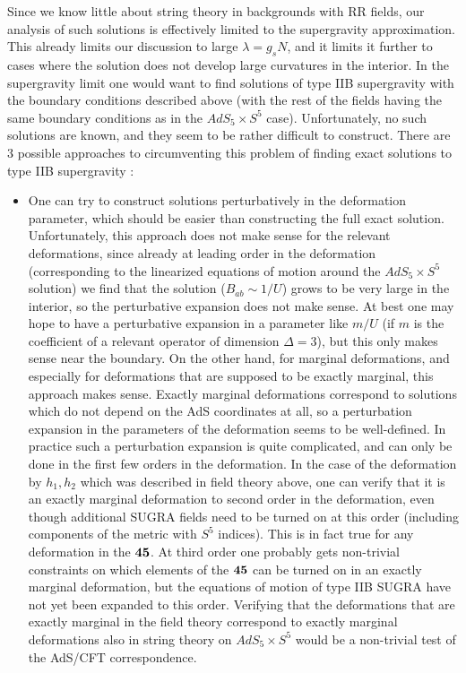  Since we know little about string theory in backgrounds
 with RR fields, our analysis of such solutions is effectively limited
 to the supergravity approximation. This already limits our discussion
 to large $\lambda=g_s N$, and it limits it further to cases where the
 solution does not develop large curvatures in the interior. In the
 supergravity limit one would want to find solutions of type IIB
 supergravity with the boundary conditions described above (with the
 rest of the fields having the same boundary conditions as in the
 $AdS_5\times S^5$ case). Unfortunately, no such solutions are
 known, and they seem to be rather difficult to construct. There are 3
 possible approaches to circumventing this problem of finding exact
 solutions to type IIB supergravity :
\begin{itemize} 
\item{} One can try to construct solutions perturbatively in the
deformation parameter, which should be easier than constructing the
full exact solution. Unfortunately, this approach does not make sense
for the relevant deformations, since already at leading order in the
deformation (corresponding to the linearized equations of motion
around the $AdS_5\times S^5$ solution) we find that the solution
($B_{ab} \sim 1/U$) grows to be very large in the interior, so the
perturbative expansion does not make sense. At best one may hope to
have a perturbative expansion in a parameter like $m/U$ (if $m$ is the
coefficient of a relevant operator of dimension $\Delta=3$),
but this only makes sense near the boundary. On the other hand, for
marginal deformations, and especially for deformations that are
supposed to be exactly marginal, this approach makes sense. Exactly
marginal deformations correspond to solutions which do not depend on
the AdS coordinates at all, so a perturbation expansion in the
parameters of the deformation seems to be well-defined. In practice
such a perturbation expansion is quite complicated, and can only be
done in the first few orders in the deformation. In the case of the
deformation by $h_1,h_2$ which was described in field theory above,
one can verify that it is an exactly marginal deformation to second
order in the deformation, even though additional SUGRA fields need to
be turned on at this order (including components of the metric with
$S^5$ indices). This is in fact true for any deformation in the $\bf
45$. At third order one probably gets non-trivial constraints on which
elements of the $\bf 45$ can be turned on in an exactly marginal
deformation, but the equations of motion of type IIB SUGRA have not
yet been expanded to this order. Verifying that the deformations that
are exactly marginal in the field theory correspond to exactly
marginal deformations also in string theory on $AdS_5\times S^5$ would
be a non-trivial test of the AdS/CFT correspondence.


\end{itemize}

